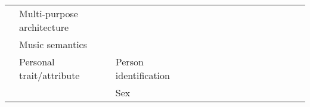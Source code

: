 \begin{tabular}{p{1.5cm}p{1.5cm}p{1.5cm}p{1.5cm}p{0.6cm}p{0.6cm}p{0.6cm}p{0.6cm}p{0.6cm}p{0.6cm}p{0.6cm}p{0.6cm}p{0.6cm}p{0.6cm}p{0.6cm}}
                                & Multi-purpose architecture &   &   &                                             \cite{Lee2018a} &                                                                                                           \cite{Zhang2018a} &                                                                        &                                      &                                                            &                      &                         &                               &    \cite{Deiss2018} &                         &                                                                      \\
                                & Music semantics &   &   &                                                             &                                                                                                           \cite{Raposo2017} &                                                                        &                                      &                                                            &                      &                         &                               &                     &                         &                                                                      \\
                                & Personal trait/attribute & Person identification &   &                                                             &                                                                                                                             &                                                                        &                                      &                                                            &                      &                         &                               &                     &                         &                                        \cite{Zhang2017e, Zhang2017c} \\
                                &                 & Sex &   &                                                             &                                                                                                       \cite{VanPutten2018b} &                                                                        &                                      &                                                            &                      &                         &                               &                     &                         &                                                                      \\

\end{tabular}

